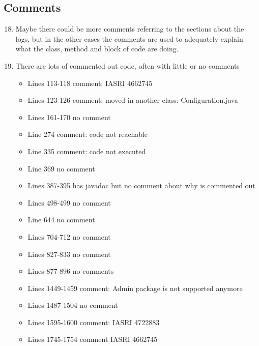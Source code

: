 \subsection{Comments}
\begin{enumerate}
	\setcounter{enumi}{17}
	\item Maybe there could be more comments referring to the sections about the logs, but in the other cases the comments are used to adequately explain what the class, method and block of code are doing.
	\item There are lots of commented out code, often with little or no comments
	\begin{itemize}
		\item Lines 113-118 comment: IASRI 4662745
		\item Lines 123-126 comment: moved in another class: Configuration.java
		\item Lines 161-170 no comment
		\item Line 274 comment: code not reachable
		\item Line 335 comment: code not executed
		\item Line 369 no comment
		\item Lines 387-395 has javadoc but no comment about why is commented out
		\item Lines 498-499 no comment
		\item Line 644 no comment
		\item Lines 704-712 no comment
		\item Lines 827-833 no comment
		\item Lines 877-896 no comments
		\item Lines 1449-1459 comment: Admin package is not supported anymore
		\item Lines 1487-1504 no comment
		\item Lines 1595-1600 comment: IASRI 4722883
		\item Lines 1745-1754 comment IASRI 4662745
	\end{itemize}
\end{enumerate}
